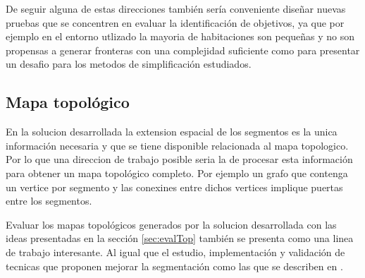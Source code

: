 De seguir alguna de estas direcciones también sería conveniente diseñar nuevas
pruebas que se concentren en evaluar la identificación de objetivos, ya que por
ejemplo en el entorno utlizado la mayoria de habitaciones son pequeñas y no son
propensas a generar fronteras con una complejidad suficiente como para
presentar un desafio para los metodos de simplificación estudiados.







\subsection{Mapa topológico}

En la solucion desarrollada la extension espacial de los segmentos es la unica
información necesaria y que se tiene disponible relacionada al mapa topologico.
Por lo que una direccion de trabajo posible seria la de procesar esta
información para obtener un mapa topológico completo. Por ejemplo un grafo que
contenga un vertice por segmento y las conexines entre dichos vertices implique
puertas entre los segmentos.

Evaluar los mapas topológicos generados por la solucion desarrollada con las
ideas presentadas en la sección \ref{sec:evalTop} también se presenta como una
linea de trabajo interesante. Al igual que el estudio, implementación y
validación de tecnicas que proponen mejorar la segmentación como las que se
describen en \cite{Thrun1998,Liu2015,wurm2008coordinated}.


